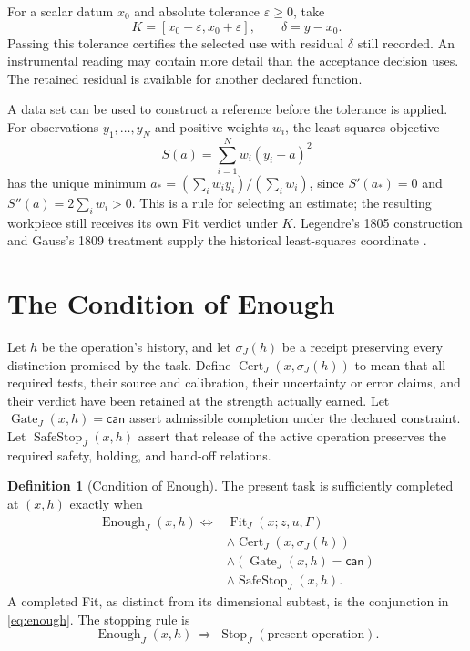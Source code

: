 \documentclass[11pt,letterpaper]{article}
\theoremstyle{definition}\newtheorem{definition}{Definition}
\newcommand{\Fit}{\operatorname{Fit}}
\newcommand{\Enough}{\operatorname{Enough}}
\newcommand{\Stop}{\operatorname{Stop}}
\newcommand{\Gate}{\operatorname{Gate}}
\newcommand{\Cert}{\operatorname{Cert}}
\newcommand{\Safe}{\operatorname{SafeStop}}
\begin{document}
For a scalar datum $x_0$ and absolute tolerance $\varepsilon\ge0$, take
\begin{equation}\label{eq:scalar}
K=[x_0-\varepsilon,x_0+\varepsilon],\qquad
\delta=y-x_0.
\end{equation}
Passing this tolerance certifies the selected use with residual $\delta$ still recorded. An instrumental reading may contain more detail than the acceptance decision uses. The retained residual is available for another declared function.

A data set can be used to construct a reference before the tolerance is applied. For observations $y_1,\ldots,y_N$ and positive weights $w_i$, the least-squares objective
\[
S(a)=\sum_{i=1}^N w_i(y_i-a)^2
\]
has the unique minimum $a_*=(\sum_i w_i y_i)/(\sum_i w_i)$, since $S'(a_*)=0$ and $S''(a)=2\sum_i w_i>0$. This is a rule for selecting an estimate; the resulting workpiece still receives its own Fit verdict under $K$. Legendre's 1805 construction and Gauss's 1809 treatment supply the historical least-squares coordinate \cite{legendre,gauss}.

\section{The Condition of Enough}
Let $h$ be the operation's history, and let $\sigma_J(h)$ be a receipt preserving every distinction promised by the task. Define $\Cert_J(x,\sigma_J(h))$ to mean that all required tests, their source and calibration, their uncertainty or error claims, and their verdict have been retained at the strength actually earned. Let $\Gate_J(x,h)=\mathsf{can}$ assert admissible completion under the declared constraint. Let $\Safe_J(x,h)$ assert that release of the active operation preserves the required safety, holding, and hand-off relations.

\begin{definition}[Condition of Enough]\label{def:enough}
The present task is sufficiently completed at $(x,h)$ exactly when
\begin{equation}\label{eq:enough}
\boxed{\begin{aligned}
\Enough_J(x,h)\iff {}&\Fit_J(x;z,u,\Gamma)\\
&\land\Cert_J(x,\sigma_J(h))\\
&\land(\Gate_J(x,h)=\mathsf{can})\\
&\land\Safe_J(x,h).
\end{aligned}}
\end{equation}
A completed Fit, as distinct from its dimensional subtest, is the conjunction in \eqref{eq:enough}. The stopping rule is
\begin{equation}\label{eq:stoprule}
\boxed{\Enough_J(x,h)\ \Longrightarrow\ \Stop_J(\text{present operation}).}
\end{equation}
\end{definition}
\end{document}
